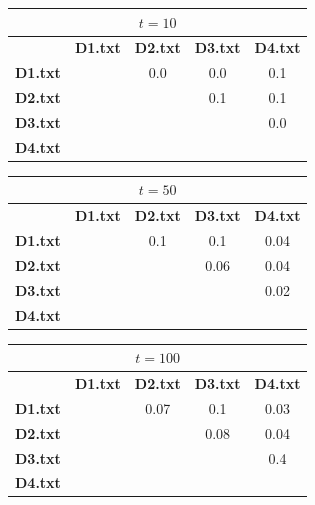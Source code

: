 \documentclass[11pt]{article}
\begin{document}
\begin{center}

\begin{tabular}{| c || c | c | c | c |}
\hline
\multicolumn{5}{|c|}{$t = 10$} \\
\hline
& \textbf{D1.txt} & \textbf{D2.txt}  & \textbf{D3.txt}  & \textbf{D4.txt} \\
\hline
\hline
\textbf{D1.txt} &  & 0.0 & 0.0 & 0.1 \\
\hline
\textbf{D2.txt} &  & & 0.1 & 0.1 \\
\hline
\textbf{D3.txt} &  &  &  & 0.0 \\
\hline
\textbf{D4.txt} &  &  &  &  \\
\hline
\end{tabular}

\end{center}


\begin{center}

\begin{tabular}{| c || c | c | c | c |}
\hline
\multicolumn{5}{|c|}{$t = 50$} \\
\hline
& \textbf{D1.txt} & \textbf{D2.txt}  & \textbf{D3.txt}  & \textbf{D4.txt} \\
\hline
\hline
\textbf{D1.txt} &  & 0.1 & 0.1 & 0.04 \\
\hline
\textbf{D2.txt} &  & & 0.06 & 0.04 \\
\hline
\textbf{D3.txt} &  &  &  & 0.02 \\
\hline
\textbf{D4.txt} &  &  &  &  \\
\hline
\end{tabular}

\end{center}


\begin{center}

\begin{tabular}{| c || c | c | c | c |}
\hline
\multicolumn{5}{|c|}{$t = 100$} \\
\hline
& \textbf{D1.txt} & \textbf{D2.txt}  & \textbf{D3.txt}  & \textbf{D4.txt} \\
\hline
\hline
\textbf{D1.txt} &  & 0.07 & 0.1 & 0.03 \\
\hline
\textbf{D2.txt} &  & & 0.08 & 0.04 \\
\hline
\textbf{D3.txt} &  &  &  & 0.4 \\
\hline
\textbf{D4.txt} &  &  &  &  \\
\hline
\end{tabular}

\end{center}
\end{document}
